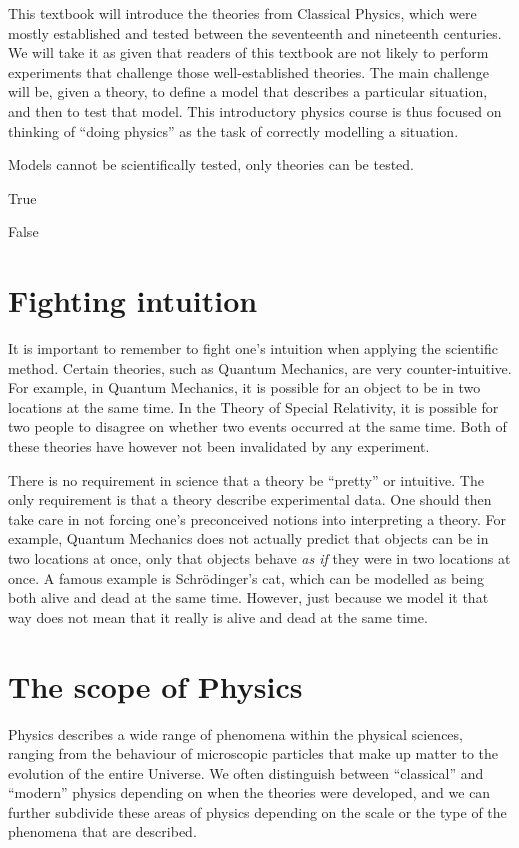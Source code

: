 This textbook will introduce the theories from Classical Physics, which were mostly established and tested between the seventeenth and nineteenth centuries. We will take it as given that readers of this textbook are not likely to perform experiments that challenge those well-established theories. The main challenge will be, given a theory, to define a model that describes a particular situation, and then to test that model. This introductory physics course is thus focused on thinking of ``doing physics'' as the task of correctly modelling a situation.

\begin{checkpointMC}{Models cannot be scientifically tested, only theories can be tested.}
\item True
\item False
\end{checkpointMC}

\section{Fighting intuition}
It is important to remember to fight one's intuition when applying the scientific method. Certain theories, such as Quantum Mechanics, are very counter-intuitive. For example, in Quantum Mechanics, it is possible for an object to be in two locations at the same time. In the Theory of Special Relativity, it is possible for two people to disagree on whether two events occurred at the same time. Both of these theories have however not been invalidated by any experiment.

There is no requirement in science that a theory be ``pretty'' or intuitive. The only requirement is that a theory describe experimental data. One should then take care in not forcing one's preconceived notions into interpreting a theory. For example, Quantum Mechanics does not actually predict that objects can be in two locations at once, only that objects behave \textit{as if} they were in two locations at once. A famous example is Schr\"odinger's cat, which can be modelled as being both alive and dead at the same time. However, just because we model it that way does not mean that it really is alive and dead at the same time. 

\section{The scope of Physics}
Physics describes a wide range of phenomena within the physical sciences, ranging from the behaviour of microscopic particles that make up matter to the evolution of the entire Universe. We often distinguish between ``classical'' and ``modern'' physics depending on when the theories were developed, and we can further subdivide these areas of physics depending on the scale or the type of the phenomena that are described.

